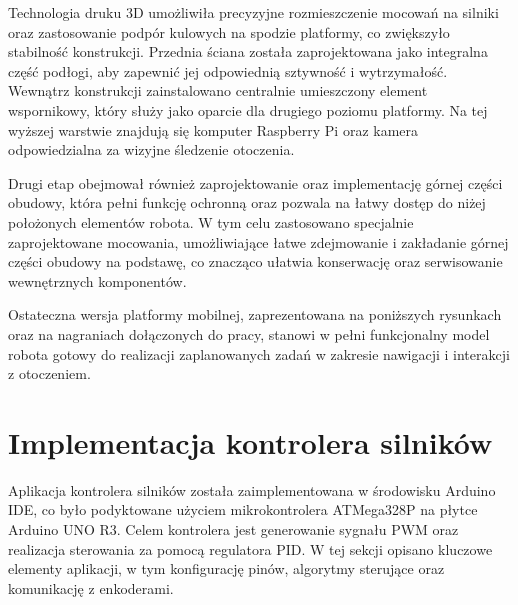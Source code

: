
Technologia druku 3D umożliwiła precyzyjne rozmieszczenie mocowań na silniki oraz zastosowanie podpór kulowych na spodzie platformy, co zwiększyło stabilność konstrukcji. Przednia ściana została zaprojektowana jako integralna część podłogi, aby zapewnić jej odpowiednią sztywność i wytrzymałość. Wewnątrz konstrukcji zainstalowano centralnie umieszczony element wspornikowy, który służy jako oparcie dla drugiego poziomu platformy. Na tej wyższej warstwie znajdują się komputer Raspberry Pi oraz kamera odpowiedzialna za wizyjne śledzenie otoczenia.

Drugi etap obejmował również zaprojektowanie oraz implementację górnej części obudowy, która pełni funkcję ochronną oraz pozwala na łatwy dostęp do niżej położonych elementów robota. W tym celu zastosowano specjalnie zaprojektowane mocowania, umożliwiające łatwe zdejmowanie i zakładanie górnej części obudowy na podstawę, co znacząco ułatwia konserwację oraz serwisowanie wewnętrznych komponentów.

Ostateczna wersja platformy mobilnej, zaprezentowana na poniższych rysunkach oraz na nagraniach dołączonych do pracy, stanowi w pełni funkcjonalny model robota gotowy do realizacji zaplanowanych zadań w zakresie nawigacji i interakcji z otoczeniem.



\section{Implementacja kontrolera silników}

Aplikacja kontrolera silników została zaimplementowana w środowisku Arduino IDE, co było podyktowane użyciem mikrokontrolera ATMega328P na płytce Arduino UNO R3. Celem kontrolera jest generowanie sygnału PWM oraz realizacja sterowania za pomocą regulatora PID. W tej sekcji opisano kluczowe elementy aplikacji, w tym konfigurację pinów, algorytmy sterujące oraz komunikację z enkoderami.

